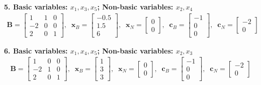 \documentclass[11pt]{article}
\newcommand{\mb}[1]{\ensuremath{\boldsymbol{#1}}}
\begin{document}
\begin{enumerate}
\begin{enumerate}
		\textbf{5. Basic variables: $x_1, x_3, x_5$; Non-basic variables: $x_2, x_4$}
		\begin{align*}
		\mb{B} = \begin{bmatrix} 1 & 1 & 0 \\ -2 & 0 & 0 \\ 2 & 0 & 1 \end{bmatrix}, \;\; 
		\mb{x}_B = \begin{bmatrix} -0.5 \\ 1.5 \\ 6 \end{bmatrix}, \;\; 
		\mb{x}_N = \begin{bmatrix} 0 \\ 0 \end{bmatrix}, \;\; 
		\mb{c}_B = \begin{bmatrix} -1 \\ 0 \\ 0 \end{bmatrix}, \;\; 
		\mb{c}_N = \begin{bmatrix} -2 \\ 0 \end{bmatrix}
		\end{align*}
		
		\textbf{6. Basic variables: $x_1, x_4, x_5$; Non-basic variables: $x_2, x_3$}
		\begin{align*}
		\mb{B} = \begin{bmatrix} 1 & 0 & 0 \\ -2 & 1 & 0 \\ 2 & 0 & 1 \end{bmatrix}, \;\; 
		\mb{x}_B = \begin{bmatrix} 1 \\ 3 \\ 3 \end{bmatrix}, \;\; 
		\mb{x}_N = \begin{bmatrix} 0 \\ 0 \end{bmatrix}, \;\; 
		\mb{c}_B = \begin{bmatrix} -1 \\ 0 \\ 0 \end{bmatrix}, \;\; 
		\mb{c}_N = \begin{bmatrix} -2 \\ 0 \end{bmatrix}
		\end{align*}
		

\end{enumerate}
\end{enumerate}
\end{document}
